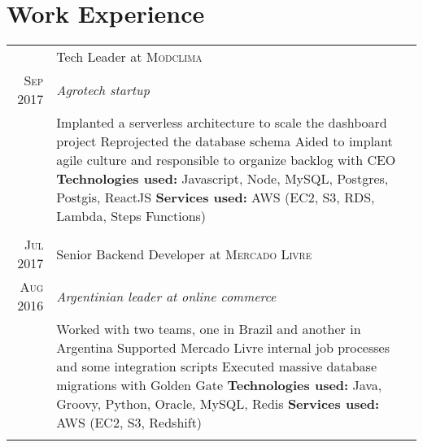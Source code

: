 \documentclass[a4paper,10pt]{article}
\begin{document}
\section{Work Experience}
\begin{tabular}{r|p{11cm}}

 \textsc{ } & Tech Leader at \textsc{Modclima} \\\textsc{Sep 2017}&\emph{Agrotech startup }\\&\footnotesize{
  Implanted a serverless architecture to scale the dashboard project\newline
  Reprojected the database schema\newline
  Aided to implant agile culture and responsible to organize backlog with CEO\newline
\textbf{Technologies used:} Javascript, Node, MySQL, Postgres, Postgis, ReactJS\newline
\textbf{Services used:} AWS (EC2, S3, RDS, Lambda, Steps Functions)}\\\multicolumn{2}{c}{} \\

 \textsc{Jul 2017} & Senior Backend Developer at \textsc{Mercado Livre} \\\textsc{Aug 2016}&\emph{Argentinian leader at online commerce }\\&\footnotesize{
  Worked with two teams, one in Brazil and another in Argentina\newline
  Supported Mercado Livre internal job processes and some integration scripts\newline
  Executed massive database migrations with Golden Gate\newline
\textbf{Technologies used:} Java, Groovy, Python, Oracle, MySQL, Redis\newline
\textbf{Services used:} AWS (EC2, S3, Redshift)}\\\multicolumn{2}{c}{} \\


\end{tabular}
\end{document}
